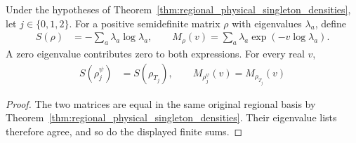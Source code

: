 \begin{theorem}
  \label{thm:regional_physical_spectral_statistics}
  \leanok
  Under the hypotheses of Theorem~\ref{thm:regional_physical_singleton_densities},
  let $j\in\{0,1,2\}$. For a positive semidefinite matrix $\rho$ with
  eigenvalues $\lambda_a$, define
  \begin{align*}
    S(\rho)&=-\sum_a\lambda_a\log\lambda_a,\qquad
    M_\rho(v)=\sum_a\lambda_a\exp(-v\log\lambda_a).
  \end{align*}
  A zero eigenvalue contributes zero to both expressions. For every real $v$,
  \begin{align*}
    S(\rho^{\psi}_j)&=S(\rho_{T_j}),\qquad
    M_{\rho^{\psi}_j}(v)=M_{\rho_{T_j}}(v)
  \end{align*}
\end{theorem}

\begin{proof}\leanok
  The two matrices are equal in the same original regional basis by
  Theorem~\ref{thm:regional_physical_singleton_densities}. Their eigenvalue
  lists therefore agree, and so do the displayed finite sums.
\end{proof}
